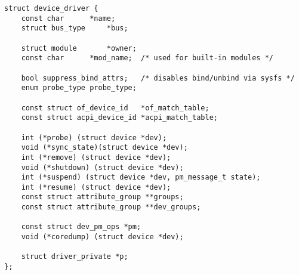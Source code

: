 
\begin{lstlisting}
struct device_driver {
	const char		*name;
	struct bus_type		*bus;

	struct module		*owner;
	const char		*mod_name;	/* used for built-in modules */

	bool suppress_bind_attrs;	/* disables bind/unbind via sysfs */
	enum probe_type probe_type;

	const struct of_device_id	*of_match_table;
	const struct acpi_device_id	*acpi_match_table;

	int (*probe) (struct device *dev);
	void (*sync_state)(struct device *dev);
	int (*remove) (struct device *dev);
	void (*shutdown) (struct device *dev);
	int (*suspend) (struct device *dev, pm_message_t state);
	int (*resume) (struct device *dev);
	const struct attribute_group **groups;
	const struct attribute_group **dev_groups;

	const struct dev_pm_ops *pm;
	void (*coredump) (struct device *dev);

	struct driver_private *p;
};
\end{lstlisting}

